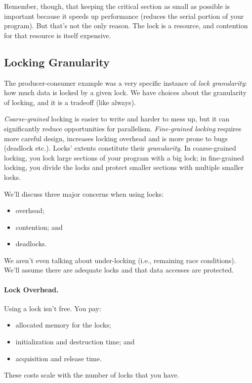 Remember, though, that keeping the critical section as small as possible is important because it speeds up performance (reduces the serial portion of your program). But that's not the only reason. The lock is a resource, and contention for that resource is itself expensive.

\subsection*{Locking Granularity}

The producer-consumer example was a very specific instance of \textit{lock granularity}: how much data is locked by a given lock. We have choices about the granularity of locking, and it is a tradeoff (like always).

\textit{Coarse-grained} locking is easier to write and harder to mess up, but it can significantly reduce opportunities for parallelism. \textit{
Fine-grained locking} requires more careful design,
increases locking overhead and is more prone to bugs (deadlock etc.).
Locks' extents constitute their {\it granularity}. In coarse-grained locking, you
lock large sections of your program with a big lock; in fine-grained
locking, you divide the locks and protect smaller sections with multiple smaller locks.

We'll discuss three major concerns when using locks: \\ \vspace*{-3em}
  \begin{itemize}[noitemsep]
    \item overhead;
    \item contention; and
    \item deadlocks.
  \end{itemize}
We aren't even talking about under-locking (i.e., remaining race conditions). We'll assume there are adequate locks and that data accesses are protected.

\paragraph{Lock Overhead.}
  Using a lock isn't free. You pay: \\ \vspace*{-3em}
  \begin{itemize}[noitemsep]
    \item allocated memory for the locks;
    \item initialization and destruction time; and
    \item acquisition and release time.
  \end{itemize}
  These costs scale with the number of locks that you have.

